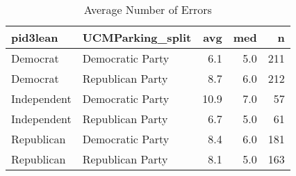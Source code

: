\begin{table}[!htb]
\centering
\begin{tabular}{llrrr}
  \hline
pid3lean & UCMParking\_split & avg & med & n \\ 
  \hline
Democrat     & Democratic Party & 6.1 & 5.0 & 211 \\ 
  Democrat     & Republican Party & 8.7 & 6.0 & 212 \\ 
  Independent  & Democratic Party & 10.9 & 7.0 & 57 \\ 
  Independent  & Republican Party & 6.7 & 5.0 & 61 \\ 
  Republican   & Democratic Party & 8.4 & 6.0 & 181 \\ 
  Republican   & Republican Party & 8.1 & 5.0 & 163 \\ 
   \hline
\end{tabular}
\caption{Average Number of Errors} 
\label{tab:error_sum}
\end{table}
